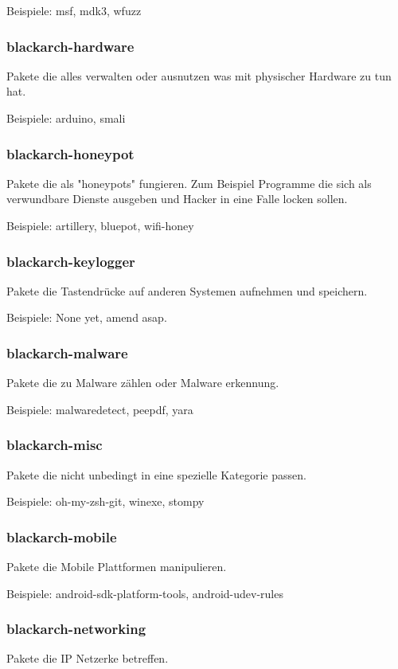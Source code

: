 \documentclass[a4paper, oneside, 11pt]{book}
\begin{document}
Beispiele: msf, mdk3, wfuzz

\subsubsection{blackarch-hardware}
Pakete die alles verwalten oder ausnutzen was mit
physischer Hardware zu tun hat.

Beispiele: arduino, smali

\subsubsection{blackarch-honeypot}
Pakete die als "honeypots" fungieren. Zum Beispiel Programme
die sich als verwundbare Dienste ausgeben und Hacker in eine Falle locken
sollen.

Beispiele: artillery, bluepot, wifi-honey

\subsubsection{blackarch-keylogger}
Pakete die Tastendrücke auf anderen Systemen aufnehmen und speichern.

Beispiele: None yet, amend asap.

\subsubsection{blackarch-malware}
Pakete die zu Malware zählen oder Malware erkennung.

Beispiele: malwaredetect, peepdf, yara

\subsubsection{blackarch-misc}
Pakete die nicht unbedingt in eine spezielle Kategorie passen.

Beispiele: oh-my-zsh-git, winexe, stompy

\subsubsection{blackarch-mobile}
Pakete die Mobile Plattformen manipulieren.

Beispiele: android-sdk-platform-tools, android-udev-rules

\subsubsection{blackarch-networking}
Pakete die IP Netzerke betreffen.
\end{document}
